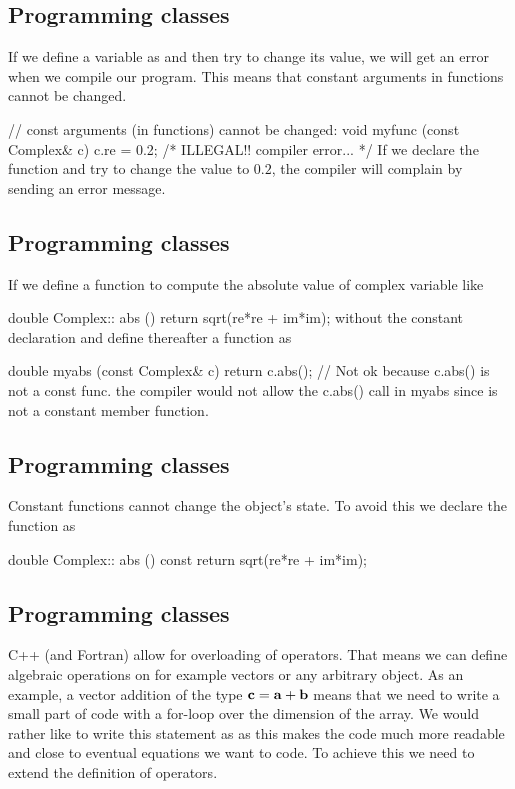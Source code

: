 \documentclass[%
twoside,                 %
final,                   %
10pt]{article}
\begin{document}
{{{{{{{{%
\subsection{Programming classes}

If we define a variable as
 and then try to change its value, we will get an error when we
compile our program. This means that constant arguments in functions cannot be changed.

\bcppcod
// const arguments (in functions) cannot be changed:
void myfunc (const Complex& c)
{ c.re = 0.2; /* ILLEGAL!! compiler error... */  }
\ecppcod
If we declare the function and try to change the value to $0.2$, the compiler will complain by sending
an error message.

\subsection{Programming classes}

If we define a function to compute the absolute value of complex variable like

\bcppcod
double Complex:: abs ()  { return sqrt(re*re + im*im);}
\ecppcod
without the constant declaration  and define thereafter a function
 as

\bcppcod
double myabs (const Complex& c)
{ return c.abs(); }   // Not ok because c.abs() is not a const func.
\ecppcod
the compiler would not allow the c.abs() call in myabs
since  is not a constant member function.

\subsection{Programming classes}

Constant functions cannot change the object's state.
To avoid this we declare the function  as

\bcppcod
double Complex:: abs () const { return sqrt(re*re + im*im); }
\ecppcod

\subsection{Programming classes}

C++ (and Fortran) allow for overloading of operators. That means we
can define algebraic operations on for example vectors or any
arbitrary object.  As an example, a vector addition of the type ${\bf
c} = {\bf a} + {\bf b}$ means that we need to write a small part of
code with a for-loop over the dimension of the array.  We would rather
like to write this statement as  as this makes the code much
more readable and close to eventual equations we want to code.  To
achieve this we need to extend the definition of operators.

}}}}}}}}
\end{document}
